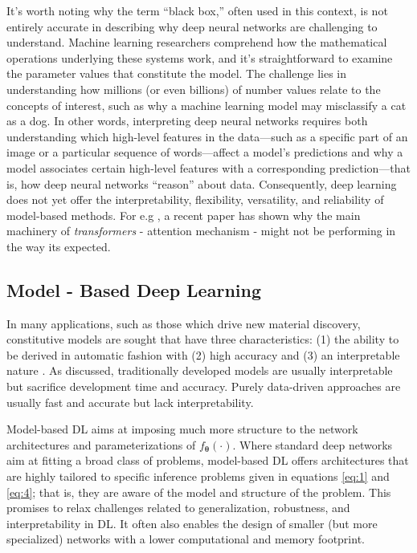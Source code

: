 It's worth noting why the term “black box,” often used in this context, is not entirely accurate in describing why deep neural networks are challenging to understand. Machine learning researchers comprehend how the mathematical operations underlying these systems work, and it's straightforward to examine the parameter values that constitute the model. The challenge lies in understanding how millions (or even billions) of number values relate to the concepts of interest, such as why a machine learning model may misclassify a cat as a dog. In other words, interpreting deep neural networks requires both understanding which high-level features in the data—such as a specific part of an image or a particular sequence of words—affect a model’s predictions and why a model associates certain high-level features with a corresponding prediction—that is, how deep neural networks “reason” about data. Consequently, deep learning does not yet offer the interpretability, flexibility, versatility, and reliability of model-based methods. For e.g , a recent paper  \cite{bai2021attentions} has shown why the main machinery of \textit{transformers} - attention mechanism - might not be performing in the way its expected.


\subsection{Model - Based Deep Learning}
In many applications, such as those which drive new material discovery, constitutive models are sought that have three characteristics: (1) the ability to be derived in automatic fashion with (2) high accuracy and (3) an interpretable nature \cite{BOMARITO2021106557}. As discussed, traditionally developed models are usually interpretable but sacrifice development time and accuracy. Purely data-driven approaches are usually fast and accurate but lack interpretability.

Model-based DL aims at imposing much more structure to the network architectures and parameterizations of $f_\mathbf{\theta}(\cdot)$. Where standard deep networks aim at fitting a broad class of problems, model-based DL offers architectures that are highly tailored to specific inference problems given in equations \eqref{eq:1} and \eqref{eq:4}; that is, they are aware of the model and structure of the problem. This promises to relax challenges related to generalization, robustness, and interpretability in DL. It often also enables the design of smaller (but more specialized) networks with a lower computational and memory footprint.

